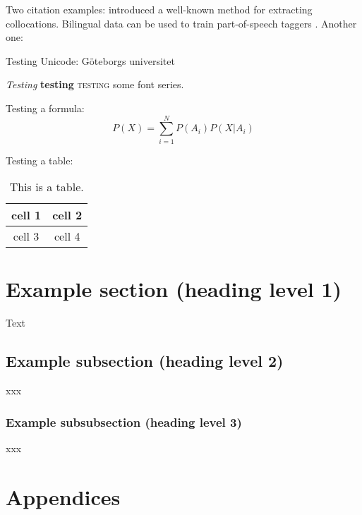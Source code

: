 \documentclass[11pt, a4paper]{article}
\begin{document}
Two citation examples: 
\cite{dunning1993} introduced a well-known method for extracting
collocations. Bilingual data can be used to train part-of-speech
taggers \citep{das2011}. Another one: \citep{cortes2014}

Testing Unicode: Göteborgs universitet

\textit{Testing} \textbf{testing} \textsc{testing} some font series.

Testing a formula:
\[
P(X) = \sum_{i=1}^N P(A_i) P(X|A_i)
\]

Testing a table:
\begin{table}[htbp]
\begin{center}
\begin{tabular}{c|c}
cell 1 & cell 2 \\
\hline
cell 3 & cell 4
\end{tabular}
\caption{This is a table.}
\end{center}
\end{table}

\newpage

\section{Example section (heading level 1)}

Text

\subsection{Example subsection (heading level 2)}

xxx

\subsubsection{Example subsubsection (heading level 3)}

xxx

\newpage





\newpage
\section{Appendices}
\end{document}
